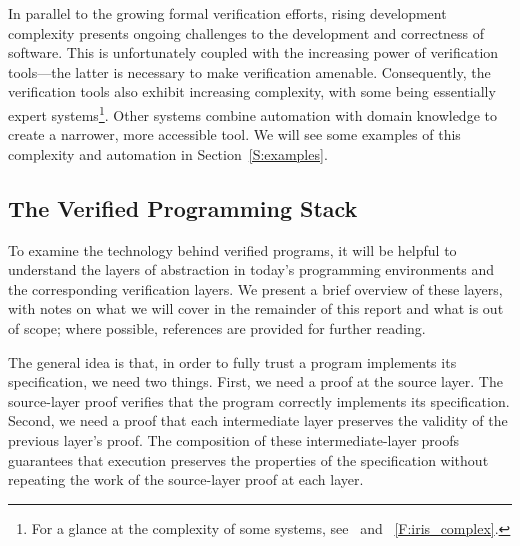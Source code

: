 In parallel to the growing formal verification efforts, rising development
complexity presents ongoing challenges to the development and correctness of
software. This is unfortunately coupled with the increasing power of
verification tools---the latter is necessary to make verification amenable.
Consequently, the verification tools also exhibit increasing complexity, with
some being essentially expert systems\footnote{For a glance at the complexity of
some systems, see~\cite{Jung_2015,Jung_2016,Krebbers_2017a,Jung_2018b} and
\figurename~\ref{F:iris_complex}.}. Other systems combine automation with domain
knowledge to create a narrower, more accessible tool. We will see some examples
of this complexity and automation in Section~\ref{S:examples}.

\subsection{The Verified Programming Stack}\label{S:stack}

To examine the technology behind verified programs, it will be helpful to
understand the layers of abstraction in today's programming environments and the
corresponding verification layers. We present a brief overview of these layers,
with notes on what we will cover in the remainder of this report and what is out
of scope; where possible, references are provided for further reading.

The general idea is that, in order to fully trust a program implements its
specification, we need two things. First, we need a proof at the source layer.
The source-layer proof verifies that the program correctly implements its
specification. Second, we need a proof that each intermediate layer preserves
the validity of the previous layer's proof. The composition of these
intermediate-layer proofs guarantees that execution preserves the properties of
the specification without repeating the work of the source-layer proof at each
layer.

